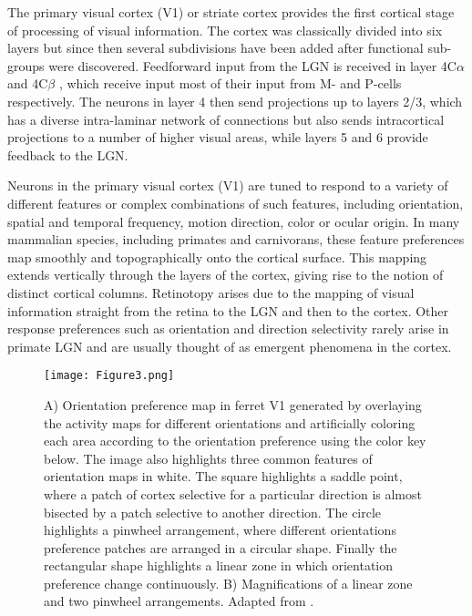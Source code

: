 The primary visual cortex (V1) or striate cortex provides the first
cortical stage of processing of visual information. The cortex was
classically divided into six layers but since then several subdivisions have
been added after functional sub-groups were discovered. Feedforward
input from the LGN is received in layer 4C$\alpha$ and 4C$\beta$ ,
which receive input most of their input from M- and P-cells
respectively. The neurons in layer 4 then send projections up to
layers 2/3, which has a diverse intra-laminar network of connections
but also sends intracortical projections to a number of higher visual
areas, while layers 5 and 6 provide feedback to the LGN.

Neurons in the primary visual cortex (V1) are tuned to respond to a
variety of different features or complex combinations of such
features, including orientation, spatial and temporal frequency,
motion direction, color or ocular origin. In many mammalian species,
including primates and carnivorans, these feature preferences map
smoothly and topographically onto the cortical surface. This mapping
extends vertically through the layers of the cortex, giving rise to
the notion of distinct cortical columns. Retinotopy arises due to the
mapping of visual information straight from the retina to the LGN and
then to the cortex. Other response preferences such as orientation and
direction selectivity rarely arise in primate LGN and are usually thought
of as emergent phenomena in the cortex.

\begin{figure}
	\centering \texttt{[image: Figure3.png]}
	\caption[A ferret orientation map in primary visual
      cortex. Adapted from \cite{Bosking1997}.]{A) Orientation
      preference map in ferret V1 generated by overlaying the activity
      maps for different orientations and artificially coloring each
      area according to the orientation preference using the color key
      below. The image also highlights three common features
      of orientation maps in white. The square highlights a saddle
      point, where a patch of cortex selective for a particular
      direction is almost bisected by a patch selective to another
      direction. The circle highlights a pinwheel arrangement, where
      different orientations preference patches are arranged in a
      circular shape. Finally the rectangular shape highlights a
      linear zone in which orientation preference change
      continuously. B) Magnifications of a linear zone and two
      pinwheel arrangements. Adapted from \cite{Bosking1997}.}
	\label{OrientationMap}
\end{figure}

